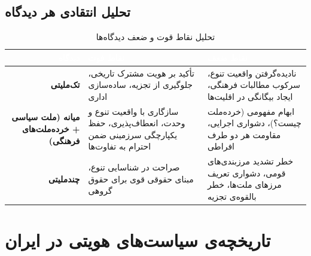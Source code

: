 \subsection{تحلیل انتقادی هر دیدگاه}

\begin{table}[htbp]
\centering
\caption{تحلیل نقاط قوت و ضعف دیدگاه‌ها}
\label{tab:iran-views-analysis}
\begin{tabularx}{\textwidth}{
  >{\bfseries\color{PrimaryDark}}r
  >{\raggedright\arraybackslash}X
  >{\raggedright\arraybackslash}X
}
\toprule
\rowcolor{PrimaryDark}
\textcolor{white}{دیدگاه} &
\textcolor{white}{نقاط قوت} &
\textcolor{white}{نقاط ضعف} \\
\midrule
تک‌ملیتی &
تأکید بر هویت مشترک تاریخی، جلوگیری از تجزیه، ساده‌سازی اداری &
نادیده‌گرفتن واقعیت تنوع، سرکوب مطالبات فرهنگی، ایجاد بیگانگی در اقلیت‌ها \\

میانه (ملت سیاسی + خرده‌ملت‌های فرهنگی) &
سازگاری با واقعیت تنوع و وحدت، انعطاف‌پذیری، حفظ یکپارچگی سرزمینی ضمن احترام به تفاوت‌ها &
ابهام مفهومی (خرده‌ملت چیست؟)، دشواری اجرایی، مقاومت هر دو طرف افراطی \\

چندملیتی &
صراحت در شناسایی تنوع، مبنای حقوقی قوی برای حقوق گروهی &
خطر تشدید مرزبندی‌های قومی، دشواری تعریف مرزهای ملت‌ها، خطر بالقوه‌ی تجزیه \\
\bottomrule
\end{tabularx}
\end{table}

\section{تاریخچه‌ی سیاست‌های هویتی در ایران}


